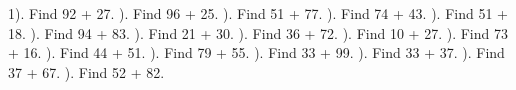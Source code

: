 \documentclass{article}%
\begin{document}
1). Find 92 + 27.%
\newline%
\newline%
). Find 96 + 25.%
\newline%
\newline%
). Find 51 + 77.%
\newline%
\newline%
). Find 74 + 43.%
\newline%
\newline%
). Find 51 + 18.%
\newline%
\newline%
). Find 94 + 83.%
\newline%
\newline%
). Find 21 + 30.%
\newline%
\newline%
). Find 36 + 72.%
\newline%
\newline%
). Find 10 + 27.%
\newline%
\newline%
). Find 73 + 16.%
\newline%
\newline%
). Find 44 + 51.%
\newline%
\newline%
). Find 79 + 55.%
\newline%
\newline%
). Find 33 + 99.%
\newline%
\newline%
). Find 33 + 37.%
\newline%
\newline%
). Find 37 + 67.%
\newline%
\newline%
). Find 52 + 82.%
\newline%
\end{document}
